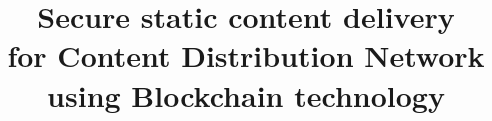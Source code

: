 \documentclass[hidelinks,conference,compsoc]{IEEEtran}
\begin{document}
%
\title{Secure static content delivery \\for Content Distribution Network using Blockchain technology}


\author{
}



% 








\maketitle
\end{document}
